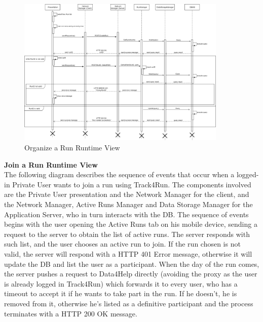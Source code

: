 \documentclass[titlepage]{article}
\begin{document}
\begin{figure}[H]
	\center
  	\includegraphics[width=10cm]{Organize.png} %
  	\caption{Organize a Run Runtime View}
 	\label{fig:SOS}
\end{figure}


{\bf Join a Run Runtime View }\\ 
The following diagram describes the sequence of events that occur when a logged-in Private User wants to join a run using Track4Run.
The components involved are the Private User presentation and the Network Manager for the client, and the Network Manager, Active Runs Manager and Data Storage Manager for the Application Server, who in turn interacts with the DB.
The sequence of events begins with the user opening the Active Runs tab on his mobile device, sending a request to the server to obtain the list of active runs. The server responds with such list, and the user chooses an active run to join. If the run chosen is not valid, the server will respond with a HTTP 401 Error message, otherwise it will update the DB and list the user as a participant.
When the day of the run comes, the server pushes a request to Data4Help directly (avoiding the proxy as the user is already logged in Track4Run) which forwards it to every user, who has a timeout to accept it if he wants to take part in the run. If he doesn’t, he is removed from it, otherwise he’s listed as a definitive participant and the process terminates with a HTTP 200 OK message.
\end{document}
